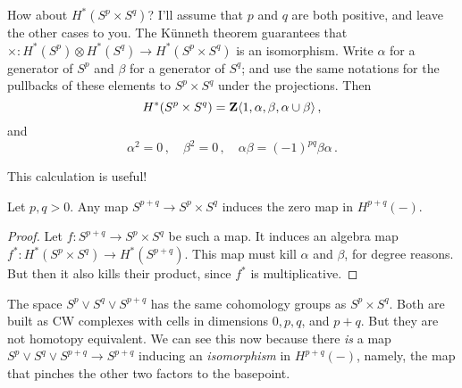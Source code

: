 \begin{example}
How about $H^\ast(S^p\times S^q)$? I'll assume that $p$ and $q$ are both
positive, and leave the other cases to you. The K\"unneth theorem guarantees
that $\times:H^*(S^p)\otimes H^*(S^q)\to H^*(S^p\times S^q)$ is an isomorphism.
Write $\alpha$ for a generator of $S^p$ and $\beta$ for a generator of 
$S^q$; and use the same notations for the pullbacks of these elements to
$S^p\times S^q$ under the projections. Then 
\[
H^*(S^p\times S^q)=\mathbf Z\langle1,\alpha,\beta,\alpha\cup\beta\rangle\,,
\]
and
\[
\alpha^2=0\,,\quad\beta^2=0\,,\quad\alpha\beta=(-1)^{pq}\beta\alpha\,.
\]

This calculation is useful!
\begin{corollary} Let $p,q>0$.
Any map $S^{p+q}\to S^p\times S^q$ induces the zero map in $H^{p+q}(-)$. 
\end{corollary}
\begin{proof}
Let $f:S^{p+q}\to S^p\times S^q$ be such a map. It induces an algebra map
$f^*:H^*(S^p\times S^q)\to H^*(S^{p+q})$. This map must kill $\alpha$ and
$\beta$, for degree reasons. But then it also kills their product, since
$f^*$ is multiplicative. 
\end{proof}
The space $S^p\vee S^q\vee S^{p+q}$ has the same cohomology groups as
$S^p\times S^q$. Both are built as CW complexes with cells in dimensions
$0, p, q$, and $p+q$. But they are not homotopy equivalent. We can see this
now because there {\em is} a map $S^p\vee S^q\vee S^{p+q}\to S^{p+q}$
inducing an {\em isomorphism} in $H^{p+q}(-)$, namely, the map that pinches
the other two factors to the basepoint. 
\end{example}
